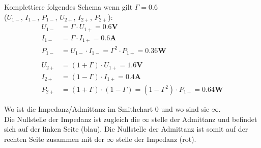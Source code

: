 
\begin{karte}{Komplettiere folgendes Schema wenn gilt $\Gamma = 0.6$\\($U_{1-}$, $I_{1-}$, $P_{1-}$, $U_{2+}$, $I_{2+}$, $P_{2+}$):\\[2pt]
	\scalebox{0.62}{}}
	\begin{align*}
		U_{1-} &= \Gamma \cdot U_{1+} = \mathbf{0.6V}\\
		I_{1-} &= \Gamma \cdot I_{1+} = \mathbf{0.6A}\\
		P_{1-} &= U_{1-} \cdot I_{1-} = \Gamma^2 \cdot P_{1+} = \mathbf{0.36W}\\
		&\\
		U_{2+} &= (1+\Gamma) \cdot U_{1+} = \mathbf{1.6V}\\
		I_{2+} &= (1-\Gamma) \cdot I_{1+} = \mathbf{0.4A}\\
		P_{2+} &= (1+\Gamma) \cdot (1-\Gamma) = (1 - \Gamma^2) \cdot P_{1+} = \mathbf{0.64W}
	\end{align*}
\end{karte}

\begin{karte}{Wo ist die Impedanz/Admittanz im Smithchart $0$ und wo sind sie $\infty$.\\
	\scalebox{0.45}{}}
	Die Nullstelle der Impedanz ist zugleich die $\infty$ stelle der Admittanz und befindet sich auf der linken Seite (blau). Die Nullstelle der Admittanz ist somit auf der rechten Seite zusammen mit der $\infty$ stelle der Impedanz (rot).
	\begin{tightcenter}
		\scalebox{0.40}{}
	\end{tightcenter}
\end{karte}
